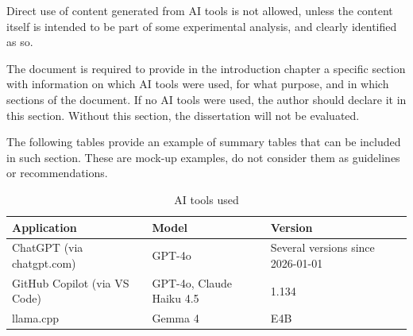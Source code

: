 Direct use of content generated from AI tools is not allowed, unless the content itself is intended to be part of some experimental analysis, and clearly identified as so.

The document is required to provide in the introduction chapter a specific section with information on which AI tools were used, for what purpose, and in which sections of the document. If no AI tools were used, the author should declare it in this section. Without this section, the dissertation will not be evaluated.

The following tables provide an example of summary tables that can be included in such section. These are mock-up examples, do not consider them as guidelines or recommendations.

\begin{table}[htbp]
  \centering
  \caption{AI tools used}
  \label{tab:ai-tools}
  \begin{tabularx}{\textwidth}{l l l}
    \toprule
    Application                  & Model                    & Version                           \\
    \midrule
    ChatGPT (via chatgpt.com)    & GPT-4o                   & Several versions since 2026-01-01 \\
    GitHub Copilot (via VS Code) & GPT-4o, Claude Haiku 4.5 & 1.134                             \\
    llama.cpp                    & Gemma 4                  & E4B                               \\
    \bottomrule
  \end{tabularx}
\end{table}


